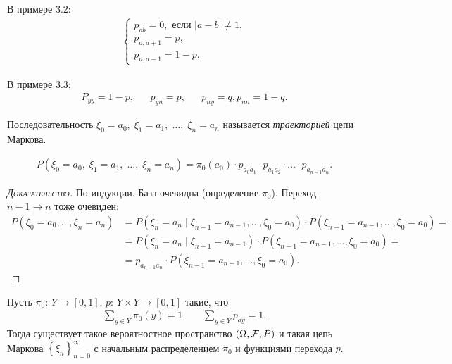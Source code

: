 \documentclass[../main.tex]{subfiles}
\begin{document}
\begin{remrk}
 В примере 3.2:
 \begin{align*}
  \begin{cases}
   p_{ab} = 0, \text{ если } \left| a-b \right| \neq 1, \\
   p_{a,a+1} = p, \\
   p_{a,a-1} = 1-p.
  \end{cases} 
 \end{align*}

 В примере 3.3:
 \begin{align*}
  P_{yy} = 1-p, && p_{yn} = p, && p_{ny} = q, p_{nn} = 1-q.
 \end{align*}
\end{remrk}

\begin{df}
 Последовательность $ \xi_0 = a_0,\; \xi_1 = a_1,\; \ldots,\; \xi_n = a_n $ называется \textit{траекторией} цепи Маркова.
\end{df}

\begin{thm}
 \begin{align*}
  P(\xi_0 = a_0,\; \xi_1 = a_1,\; \ldots,\; \xi_n = a_n) = \pi_0(a_0) \cdot  p_{a_0 a_1} \cdot p_{a_1 a_2} \cdot  \ldots \cdot p_{a_{n-1}a_n}.
 \end{align*}
 \begin{proof}[\normalfont\textsc{Доказательство}]
  По индукции. База очевидна (определение $ \pi_0 $). Переход $ n-1 \to n $ тоже очевиден:
  \begin{align*}
   P(\xi_0 = a_0, \ldots, \xi_n = a_n) &= P(\xi_n = a_n \mid \xi_{n-1} = a_{n-1},\ldots,\xi_0 = a_0) \cdot P(\xi_{n-1} = a_{n-1},\ldots,\xi_0=a_0) = \\
   &= P(\xi_n = a_n \mid \xi_{n-1} = a_{n-1}) \cdot P(\xi_{n-1} = a_{n-1}, \ldots, \xi_0 = a_0) = \\
   &= p_{a_{n-1}a_n} \cdot P(\xi_{n-1} = a_{n-1},\ldots,\xi_0 = a_0).
  \end{align*}
 \end{proof}
\end{thm}

\begin{thm}
 Пусть $ \pi_0 \colon\, Y \to [0,1] $, $ p \colon\, Y \times Y \to [0,1] $ такие, что
 \begin{align*}
  \sum_{y \in Y} \pi_0(y) = 1, && \sum_{y \in Y} p_{ay} = 1.
 \end{align*} Тогда существует такое вероятностное пространство $ (\Omega,\mathcal F,P) $ и такая цепь Маркова $ \left\{\xi_n \right\}_{n=0}^{\infty} $ с начальным распределением $ \pi_0 $ и функциями перехода $ p $.
\end{thm}
\end{document}
